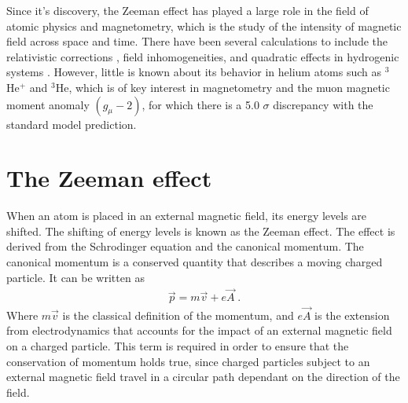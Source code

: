         Since it's discovery, the Zeeman effect has played a large role in the field of atomic physics and magnetometry, which is the study of the intensity of magnetic field across space and time. There have been several calculations to include the relativistic corrections \cite{2007Drake-Wu, Drake-Yan}, field inhomogeneities, and quadratic effects in hydrogenic systems \cite{Fontanari_Sadovskií_2015}. However, little is known about its behavior in helium atoms such as $^3$He$^+$ and $^3$He, which is of key interest in magnetometry and the muon magnetic moment anomaly $(g_\mu - 2)$, for which there is a 5.0 $\sigma$ discrepancy \cite{aguillard2023measurement} with the standard model prediction.

    \section{The Zeeman effect}\label{sec:quadratic_zeeman}
        When an atom is placed in an external magnetic field, its energy levels are shifted. The shifting of energy levels is known as the Zeeman effect. The effect is derived from the Schrodinger equation and the canonical momentum. The canonical momentum is a conserved quantity that describes a moving charged particle. It can be written as 
        \begin{align}
            \vec{p} = m\vec{v} + e\vec{A}\;.
        \end{align}
        \noindent Where $m\vec{v}$ is the classical definition of the momentum, and $e\vec{A}$ is the extension from electrodynamics that accounts for the impact of an external magnetic field on a charged particle. This term is required in order to ensure that the conservation of momentum holds true, since charged particles subject to an external magnetic field travel in a circular path dependant on the direction of the field.\\
        
